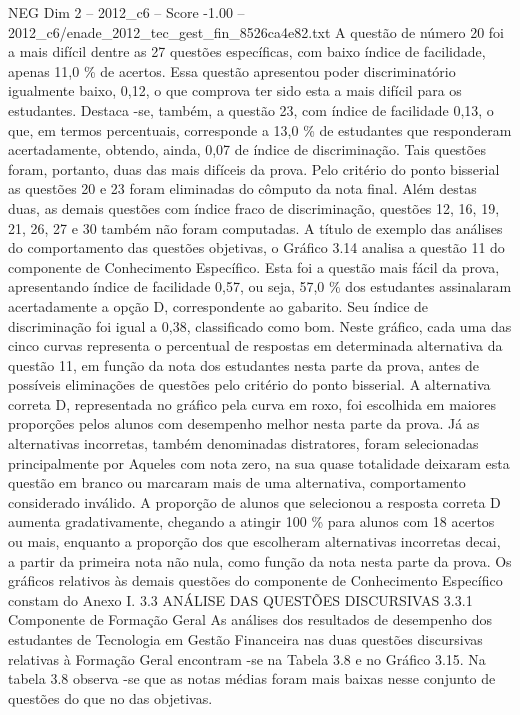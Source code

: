 \begin{textsample}{NEG Dim 2 – 2012\_c6 – Score -1.00 – 2012\_c6/enade\_2012\_tec\_gest\_fin\_8526ca4e82.txt}
A questão de número 20 foi a mais difícil dentre as 27 questões específicas, com baixo índice de facilidade, apenas 11,0 \% de acertos.
Essa questão apresentou poder discriminatório igualmente baixo, 0,12, o que comprova ter sido esta a mais difícil para os estudantes.
Destaca -se, também, a questão 23, com índice de facilidade 0,13, o que, em termos percentuais, corresponde a 13,0 \% de estudantes que responderam acertadamente, obtendo, ainda, 0,07 de índice de discriminação.
Tais questões foram, portanto, duas das mais difíceis da prova.
Pelo critério do ponto bisserial as questões 20 e 23 foram eliminadas do cômputo da nota final.
Além destas duas, as demais questões com índice fraco de discriminação, questões 12, 16, 19, 21, 26, 27 e 30 também não foram computadas.
A título de exemplo das análises do comportamento das questões objetivas, o Gráfico 3.14 analisa a questão 11 do componente de Conhecimento Específico.
Esta foi a questão mais fácil da prova, apresentando índice de facilidade 0,57, ou seja, 57,0 \% dos estudantes assinalaram acertadamente a opção D, correspondente ao gabarito.
Seu índice de discriminação foi igual a 0,38, classificado como bom.
Neste gráfico, cada uma das cinco curvas representa o percentual de respostas em determinada alternativa da questão 11, em função da nota dos estudantes nesta parte da prova, antes de possíveis eliminações de questões pelo critério do ponto bisserial.
A alternativa correta D, representada no gráfico pela curva em roxo, foi escolhida em maiores proporções pelos alunos com desempenho melhor nesta parte da prova.
Já as alternativas incorretas, também denominadas distratores, foram selecionadas principalmente por Aqueles com nota zero, na sua quase totalidade deixaram esta questão em branco ou marcaram mais de uma alternativa, comportamento considerado inválido.
A proporção de alunos que selecionou a resposta correta D aumenta gradativamente, chegando a atingir 100 \% para alunos com 18 acertos ou mais, enquanto a proporção dos que escolheram alternativas incorretas decai, a partir da primeira nota não nula, como função da nota nesta parte da prova.
Os gráficos relativos às demais questões do componente de Conhecimento Específico constam do Anexo I. 3.3 ANÁLISE DAS QUESTÕES DISCURSIVAS 3.3.1 Componente de Formação Geral As análises dos resultados de desempenho dos estudantes de Tecnologia em Gestão Financeira nas duas questões discursivas relativas à Formação Geral encontram -se na Tabela 3.8 e no Gráfico 3.15.
Na tabela 3.8 observa -se que as notas médias foram mais baixas nesse conjunto de questões do que no das objetivas.

\end{textsample}
